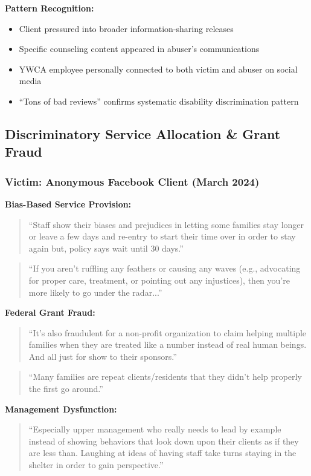 \documentclass[11pt,letterpaper]{article}
\begin{document}
\textbf{Pattern Recognition:}
\begin{itemize}[leftmargin=*]
\item Client pressured into broader information-sharing releases
\item Specific counseling content appeared in abuser's communications
\item YWCA employee personally connected to both victim and abuser on social media
\item ``Tons of bad reviews'' confirms systematic disability discrimination pattern
\end{itemize}

\subsection{Discriminatory Service Allocation \& Grant Fraud}

\subsubsection{Victim: Anonymous Facebook Client (March 2024)}

\textbf{Bias-Based Service Provision:}
\begin{quote}
``Staff show their biases and prejudices in letting some families stay longer or leave a few days and re-entry to start their time over in order to stay again but, policy says wait until 30 days.''
\end{quote}

\begin{quote}
``If you aren't ruffling any feathers or causing any waves (e.g., advocating for proper care, treatment, or pointing out any injustices), then you're more likely to go under the radar...''
\end{quote}

\textbf{Federal Grant Fraud:}
\begin{quote}
``It's also fraudulent for a non-profit organization to claim helping multiple families when they are treated like a number instead of real human beings. And all just for show to their sponsors.''
\end{quote}

\begin{quote}
``Many families are repeat clients/residents that they didn't help properly the first go around.''
\end{quote}

\textbf{Management Dysfunction:}
\begin{quote}
``Especially upper management who really needs to lead by example instead of showing behaviors that look down upon their clients as if they are less than. Laughing at ideas of having staff take turns staying in the shelter in order to gain perspective.''
\end{quote}
\end{document}
